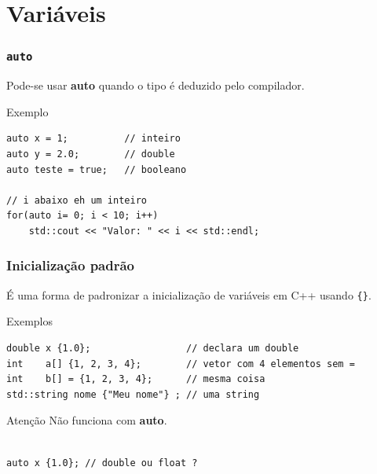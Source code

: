 \documentclass[xcolor={usenames,dvipsnames},10pt,presentation,aspectratio=169]{beamer}
\begin{document}
\section{Variáveis}
\begin{frame}[fragile]
  \frametitle{\texttt{auto}}
Pode-se usar \textbf{auto} quando o tipo é deduzido pelo compilador.
  \begin{block}{Exemplo}
\begin{lstlisting}
auto x = 1;          // inteiro
auto y = 2.0;        // double
auto teste = true;   // booleano

// i abaixo eh um inteiro
for(auto i= 0; i < 10; i++)
    std::cout << "Valor: " << i << std::endl;
\end{lstlisting}
  \end{block}
\end{frame}
\begin{frame}[fragile]
  \frametitle{Inicialização padrão}
É uma forma de padronizar a inicialização de variáveis em C++ usando \verb+{}+.
  \begin{block}{Exemplos}
\begin{lstlisting}
double x {1.0};                 // declara um double
int    a[] {1, 2, 3, 4};        // vetor com 4 elementos sem = 
int    b[] = {1, 2, 3, 4};      // mesma coisa
std::string nome {"Meu nome"} ; // uma string
\end{lstlisting}
  \end{block}
\begin{alertblock}{Atenção}
Não funciona com \textbf{auto}.
\begin{lstlisting}

auto x {1.0}; // double ou float ?
\end{lstlisting}
\end{alertblock}
\end{frame}
\end{document}

